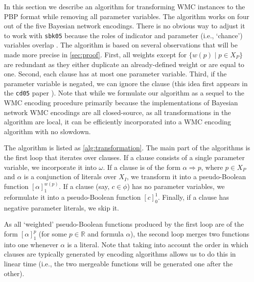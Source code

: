 \documentclass[runningheads]{llncs}
\begin{document}
In this section we describe an algorithm for transforming WMC instances to the
PBP format while removing all parameter variables. The algorithm works on four
out of the five Bayesian network encodings. There is no obvious way to adjust it
to work with \texttt{sbk05} because the roles of indicator and parameter (i.e.,
`chance') variables overlap \cite{DBLP:conf/aaai/SangBK05}. The algorithm is
based on several observations that will be made more precise in
\cref{sec:proof}. First, all weights except for $\{w(p) \mid p \in X_P\}$ are
redundant as they either duplicate an already-defined weight or are equal to
one. Second, each clause has at most one parameter variable. Third, if the
parameter variable is negated, we can ignore the clause (this idea first appears
in the \texttt{cd05} paper \cite{DBLP:conf/ijcai/ChaviraD05}). Note that while
we formulate our algorithm as a sequel to the WMC encoding procedure primarily
because the implementations of Bayesian network WMC encodings are all
closed-source, as all transformations in the algorithm are local, it can be
efficiently incorporated into a WMC encoding algorithm with no slowdown.

The algorithm is listed as \cref{alg:transformation}. The main part of the
algorithms is the first loop that iterates over clauses. If a clause consists of
a single parameter variable, we incorporate it into $\omega$. If a clause is
of the form $\alpha \Rightarrow p$, where $p \in X_P$ and $\alpha$ is a
conjunction of literals over $X_I$, we transform it into a pseudo-Boolean
function $[\alpha]_1^{w(p)}$. If a clause (say, $c \in \phi$) has no parameter
variables, we reformulate it into a pseudo-Boolean function $[c]_0^1$. Finally,
if a clause has negative parameter literals, we skip it.

As all `weighted' pseudo-Boolean functions produced by the first loop are of the
form $[\alpha]_1^p$ (for some $p \in \mathbb{R}$ and formula $\alpha$), the
second loop merges two functions into one whenever $\alpha$ is a literal. Note
that taking into account the order in which clauses are typically generated by
encoding algorithms allows us to do this in linear time (i.e., the two mergeable
functions will be generated one after the other).

\end{document}
